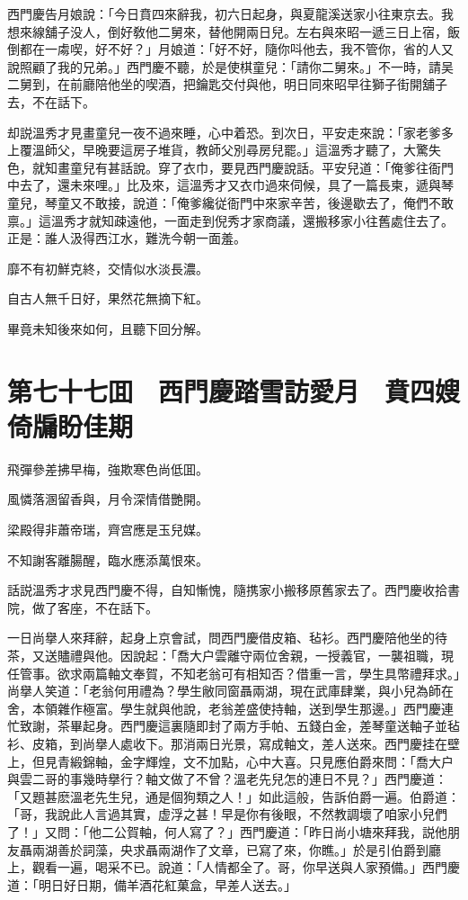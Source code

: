 西門慶告月娘說：「今日賁四來辭我，初六日起身，與夏龍溪送家小往東京去。我想來線舖子没人，倒好敎他二舅來，替他開兩日兒。左右與來昭一遞三日上宿，飯倒都在一䖏喫，好不好？」月娘道：「好不好，隨你呌他去，我不管你，省的人又說照顧了我的兄弟。」西門慶不聽，於是使棋童兒：「請你二舅來。」不一時，請吴二舅到，在前廳陪他坐的喫酒，把鑰匙交付與他，明日同來昭早往獅子街開舖子去，不在話下。

却説溫秀才見畫童兒一夜不過來睡，心中着恐。到次日，平安走來說：「家老爹多上覆溫師父，早晚要這房子堆貨，教師父別尋房兒罷。」這溫秀才聽了，大驚失色，就知畫童兒有甚話說。穿了衣巾，要見西門慶說話。平安兒道：「俺爹往衙門中去了，還未來哩。」比及來，這溫秀才又衣巾過來伺候，具了一篇長柬，遞與琴童兒，琴童又不敢接，說道：「俺爹纔従衙門中來家辛苦，後邊歇去了，俺們不敢禀。」這溫秀才就知疎遠他，一面走到倪秀才家商議，還搬移家小往舊處住去了。正是：誰人汲得西江水，難洗今朝一面羞。

靡不有初鮮克終，交情似水淡長濃。

自古人無千日好，果然花無摘下紅。

畢竟未知後來如何，且聽下回分解。

\chapter*{第七十七囬　西門慶踏雪訪愛月　賁四嫂倚牖盼佳期}

飛彈參差拂早梅，強欺寒色尚低囬。

風憐落溷留香與，月令深情借艷開。

梁殿得非蕭帝瑞，齊宫應是玉兒媒。

不知謝客離腸醒，臨水應添萬恨來。

話説溫秀才求見西門慶不得，自知慚愧，隨携家小搬移原舊家去了。西門慶收拾書院，做了客座，不在話下。

一日尚擧人來拜辭，起身上京會試，問西門慶借皮箱、毡衫。西門慶陪他坐的待茶，又送贐禮與他。因說起：「喬大户雲離守兩位舍親，一授義官，一襲祖職，現任管事。欲求兩篇軸文奉賀，不知老翁可有相知否？借重一言，學生具幣禮拜求。」尚擧人笑道：「老翁何用禮為？學生敝同窗聶兩湖，現在武庫肆業，與小兒為師在舍，本領雜作極富。學生就與他說，老翁差盛使持軸，送到學生那邊。」西門慶連忙致謝，茶畢起身。西門慶這裏隨即封了兩方手帕、五錢白金，差琴童送軸子並毡衫、皮箱，到尚擧人處收下。那消兩日光景，寫成軸文，差人送來。西門慶挂在壁上，但見青緞錦軸，金字輝煌，文不加點，心中大喜。只見應伯爵來問：「喬大户與雲二哥的事幾時擧行？軸文做了不曾？溫老先兒怎的連日不見？」西門慶道：「又題甚麽溫老先生兒，通是個狗類之人！」如此這般，告訴伯爵一遍。伯爵道：「哥，我說此人言過其實，虚浮之甚！早是你有後眼，不然教調壞了咱家小兒們了！」又問：「他二公賀軸，何人寫了？」西門慶道：「昨日尚小塘來拜我，説他朋友聶兩湖善於詞藻，央求聶兩湖作了文章，已寫了來，你瞧。」於是引伯爵到廳上，觀看一遍，喝采不已。說道：「人情都全了。哥，你早送與人家預備。」西門慶道：「明日好日期，備羊酒花紅菓盒，早差人送去。」


